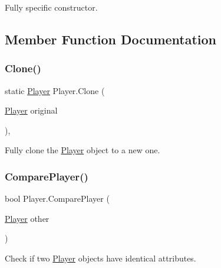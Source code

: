 Fully specific constructor. 



\subsection{Member Function Documentation}
\mbox{\label{class_player_adf965ae02f9b21712dcd93b8a2f955f4}} 
\subsubsection{\texorpdfstring{Clone()}{Clone()}}
{\footnotesize\ttfamily static \mbox{\hyperlink{class_player}{Player}} Player.\+Clone (\begin{DoxyParamCaption}\item[{\mbox{\hyperlink{class_player}{Player}}}]{original }\end{DoxyParamCaption})\hspace{0.3cm}{\ttfamily [inline]}, {\ttfamily [static]}}



Fully clone the \mbox{\hyperlink{class_player}{Player}} object to a new one. 

\mbox{\label{class_player_a4801fed9ec34d0eac42ca4c474b3e584}} 
\subsubsection{\texorpdfstring{ComparePlayer()}{ComparePlayer()}}
{\footnotesize\ttfamily bool Player.\+Compare\+Player (\begin{DoxyParamCaption}\item[{\mbox{\hyperlink{class_player}{Player}}}]{other }\end{DoxyParamCaption})\hspace{0.3cm}{\ttfamily [inline]}}



Check if two \mbox{\hyperlink{class_player}{Player}} objects have identical attributes. 

\mbox{\label{class_player_a9278b5c20dc0e3b2cab022cccacac63c}} 

